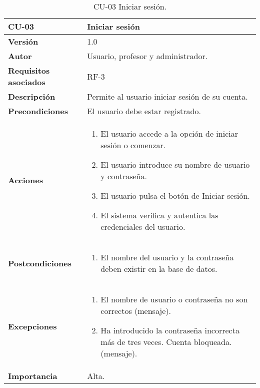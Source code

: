 \begin{table}[h!]
	\centering
	\begin{tabularx}{\linewidth}{ p{} p{} }
		\toprule
		\textbf{CU-03}    & \textbf{Iniciar sesión}\\
		\toprule
		\textbf{Versión}              & 1.0    \\
		\textbf{Autor}                & Usuario, profesor y administrador. \\
		\textbf{Requisitos asociados} & RF-3\\
		\textbf{Descripción}          & Permite al usuario iniciar sesión de su cuenta. \\
		\textbf{Precondiciones}         & El usuario debe estar registrado. \\
		\textbf{Acciones}             &
		\begin{enumerate}
			\def\labelenumi{\arabic{enumi}.}
			\tightlist
			\item El usuario accede a la opción de iniciar sesión o comenzar.
			\item El usuario introduce su nombre de usuario y contraseña.
            \item El usuario pulsa el botón de Iniciar sesión.
            \item El sistema verifica y autentica las credenciales del usuario.
		\end{enumerate}\\
         \textbf{Postcondiciones}             &
		\begin{enumerate}
			\def\labelenumi{\arabic{enumi}.}
			\tightlist
			\item El nombre del usuario y la contraseña deben existir en la base de datos.
		\end{enumerate}\\
		\textbf{Excepciones}             &
		\begin{enumerate}
			\def\labelenumi{\arabic{enumi}.}
			\tightlist
			\item El nombre de usuario o contraseña no son correctos (mensaje).
			\item Ha introducido la contraseña incorrecta más de tres veces. Cuenta bloqueada. (mensaje).
		\end{enumerate}\\
		\textbf{Importancia}          & Alta. \\
		\bottomrule
	\end{tabularx}
	\caption{CU-03 Iniciar sesión.}
\end{table}

